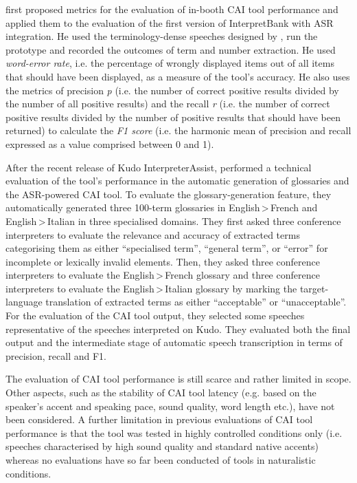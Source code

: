 \citet{fantinuoli2017speech} first proposed metrics for the evaluation of in-booth CAI tool performance and applied them to the evaluation of the first version of InterpretBank with ASR integration. He used the terminology-dense speeches designed by \citet{prandi2017designing}, run the prototype and recorded the outcomes of term and number extraction. He used \textit{word-error rate}, i.e. the percentage of wrongly displayed items out of all items that should have been displayed, as a measure of the tool’s accuracy. He also uses the metrics of precision \textit{p} (i.e. the number of correct positive results divided by the number of all positive results) and the recall \textit{r} (i.e. the number of correct positive results divided by the number of positive results that should have been returned) to calculate the \textit{F1 score} (i.e. the harmonic mean of precision and recall expressed as a value comprised between 0 and 1).

After the recent release of Kudo InterpreterAssist, \citet{FantinuoliEtAlForthcoming} performed a technical evaluation of the tool’s performance in the automatic generation of glossaries and the ASR-powered CAI tool. To evaluate the glossary-generation feature, they automatically generated three 100-term glossaries in English\,>\,French and English\,>\,Italian in three specialised domains. They first asked three conference interpreters to evaluate the relevance and accuracy of extracted terms categorising them as either ``specialised term'', ``general term'', or ``error'' for incomplete or lexically invalid elements. Then, they asked three conference interpreters to evaluate the English\,>\,French glossary and three conference interpreters to evaluate the English\,>\,Italian glossary by marking the target-language translation of extracted terms as either ``acceptable'' or ``unacceptable''. For the evaluation of the CAI tool output, they selected some speeches representative of the speeches interpreted on Kudo. They evaluated both the final output and the intermediate stage of automatic speech transcription in terms of precision, recall and F1.

The evaluation of CAI tool performance is still scarce and rather limited in scope. Other aspects, such as the stability of CAI tool latency (e.g. based on the speaker’s accent and speaking pace, sound quality, word length etc.), have not been considered. A further limitation in previous evaluations of CAI tool performance is that the tool was tested in highly controlled conditions only (i.e. speeches characterised by high sound quality and standard native accents) whereas no evaluations have so far been conducted of tools in naturalistic conditions.


